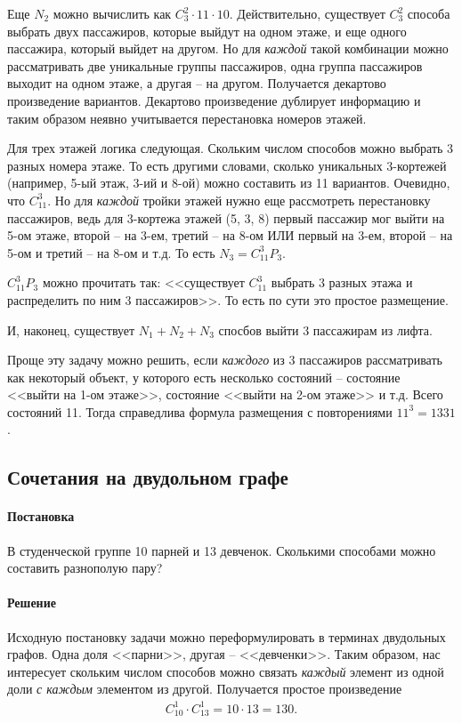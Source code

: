 \documentclass[%
	11pt,
	a4paper,
	utf8,
		]{article}
\begin{document}
Еще $ N_2 $ можно вычислить как $ C_3^2 \cdot 11 \cdot 10 $. Действительно, существует $ C_3^2 $ способа выбрать двух пассажиров, которые выйдут на одном этаже, и еще одного пассажира, который выйдет на другом. Но для \emph{каждой} такой комбинации можно рассматривать две уникальные группы пассажиров, одна группа пассажиров выходит на одном этаже, а другая -- на другом. Получается декартово произведение вариантов. Декартово произведение дублирует информацию и таким образом неявно учитывается перестановка номеров этажей.

Для трех этажей логика следующая. Скольким числом способов можно выбрать 3 разных номера этаже. То есть другими словами, сколько уникальных 3-кортежей (например, 5-ый этаж, 3-ий и 8-ой) можно составить из 11 вариантов. Очевидно, что $ C_{11}^3 $. Но для \emph{каждой} тройки этажей нужно еще рассмотреть перестановку пассажиров, ведь для 3-кортежа этажей (5, 3, 8) первый пассажир мог выйти на 5-ом этаже, второй -- на 3-ем, третий -- на 8-ом ИЛИ первый на 3-ем, второй -- на 5-ом и третий -- на 8-ом и т.д. То есть $ N_3 = C_{11}^3 P_3 $.

$ C_{11}^3 P_3 $ можно прочитать так: <<существует $ C_{11} ^3 $ выбрать 3 разных этажа и распределить по ним 3 пассажиров>>. То есть по сути это простое размещение.

И, наконец, существует $ N_1 + N_2 + N_3 $ спосбов выйти 3 пассажирам из лифта.

Проще эту задачу можно решить, если \emph{каждого} из 3 пассажиров рассматривать как некоторый объект, у которого есть несколько состояний -- состояние <<выйти на 1-ом этаже>>, состояние <<выйти на 2-ом этаже>> и т.д. Всего состояний 11. Тогда справедлива формула размещения с повторениями $ 11^{3} = 1331 $.

\subsection{Сочетания на двудольном графе}

\paragraph{Постановка} В студенческой группе 10 парней и 13 девченок. Сколькими способами можно составить разнополую пару?

\paragraph{Решение} Исходную постановку задачи можно переформулировать в терминах двудольных графов. Одна доля <<парни>>, другая -- <<девченки>>. Таким образом, нас интересует скольким числом способов можно связать \emph{каждый} элемент из одной доли \emph{с каждым} элементом из другой. Получается простое произведение
\begin{align*}
	C_{10}^1 \cdot C_{13}^1 = 10 \cdot 13 = 130.
\end{align*}
\end{document}
